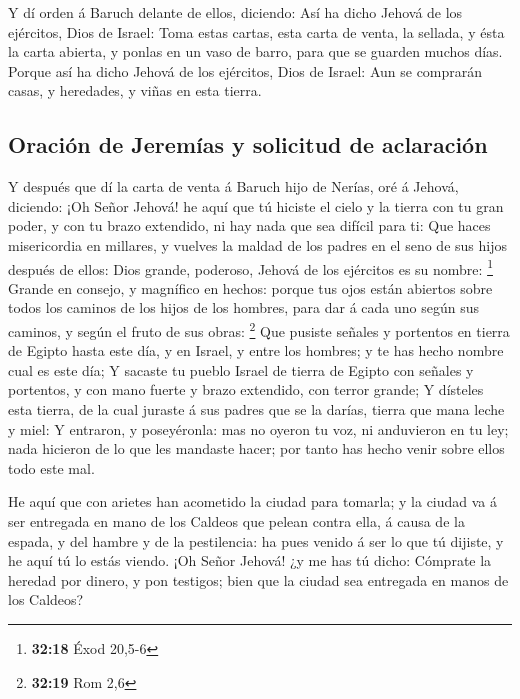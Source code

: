  Y dí orden á Baruch delante de ellos, diciendo:
 Así ha dicho Jehová de los ejércitos, Dios de Israel:
Toma estas cartas, esta carta de venta, la sellada, y ésta la carta
abierta, y ponlas en un vaso de barro, para que se guarden muchos días.
 Porque así ha dicho Jehová de los ejércitos, Dios de
Israel: Aun se comprarán casas, y heredades, y viñas en esta tierra.

\hypertarget{oraciuxf3n-de-jeremuxedas-y-solicitud-de-aclaraciuxf3n}{%
\subsection{Oración de Jeremías y solicitud de
aclaración}\label{oraciuxf3n-de-jeremuxedas-y-solicitud-de-aclaraciuxf3n}}

 Y después que dí la carta de venta á Baruch hijo de
Nerías, oré á Jehová, diciendo:  ¡Oh Señor Jehová! he
aquí que tú hiciste el cielo y la tierra con tu gran poder, y con tu
brazo extendido, ni hay nada que sea difícil para ti: 
Que haces misericordia en millares, y vuelves la maldad de los padres en
el seno de sus hijos después de ellos: Dios grande, poderoso, Jehová de
los ejércitos es su nombre: \footnote{\textbf{32:18} Éxod 20,5-6}
 Grande en consejo, y magnífico en hechos: porque tus
ojos están abiertos sobre todos los caminos de los hijos de los hombres,
para dar á cada uno según sus caminos, y según el fruto de sus obras:
\footnote{\textbf{32:19} Rom 2,6}  Que pusiste señales y
portentos en tierra de Egipto hasta este día, y en Israel, y entre los
hombres; y te has hecho nombre cual es este día;  Y
sacaste tu pueblo Israel de tierra de Egipto con señales y portentos, y
con mano fuerte y brazo extendido, con terror grande;  Y
dísteles esta tierra, de la cual juraste á sus padres que se la darías,
tierra que mana leche y miel:  Y entraron, y poseyéronla:
mas no oyeron tu voz, ni anduvieron en tu ley; nada hicieron de lo que
les mandaste hacer; por tanto has hecho venir sobre ellos todo este mal.

 He aquí que con arietes han acometido la ciudad para
tomarla; y la ciudad va á ser entregada en mano de los Caldeos que
pelean contra ella, á causa de la espada, y del hambre y de la
pestilencia: ha pues venido á ser lo que tú dijiste, y he aquí tú lo
estás viendo.  ¡Oh Señor Jehová! ¿y me has tú dicho:
Cómprate la heredad por dinero, y pon testigos; bien que la ciudad sea
entregada en manos de los Caldeos?

